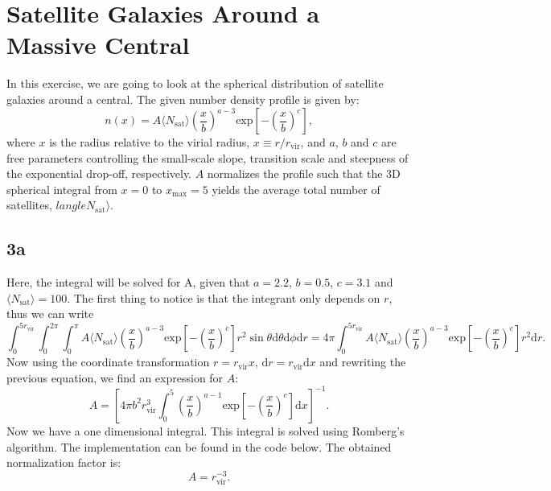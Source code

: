 \section{Satellite Galaxies Around a Massive Central}
In this exercise, we are going to look at the spherical distribution of satellite galaxies around a central. The given number density profile is given by:
\begin{equation}
  n(x) = A \langle N_\mathrm{sat}\rangle \left( \frac{x}{b} \right) ^{a-3} \mathrm{exp} \left[ - \left( \frac{x}{b} \right)^{c} \right],
\end{equation}
where $x$ is the radius relative to the virial radius, $x\equiv r/r_\mathrm{vir}$, and $a$, $b$ and $c$ are free parameters controlling the small-scale slope, transition scale and steepness of the exponential drop-off, respectively. $A$ normalizes the profile such that the 3D spherical integral from $x=0$ to $x_\mathrm{max}=5$ yields the average total number of satellites, $langle N_\mathrm{sat}\rangle$.

\subsection*{3a}
Here, the integral will be solved for A, given that $a = 2.2$, $b = 0.5$, $c = 3.1$ and $\langle N_\mathrm{sat}\rangle = 100$. The first thing to notice is that the integrant only depends on $r$, thus we can write
\begin{equation}
  \int_0^{5r_{\mathrm{vir}}} \int_0^{2\pi} \int_0^{\pi} A \langle N_\mathrm{sat}\rangle \left( \frac{x}{b} \right) ^{a-3} \mathrm{exp} \left[ - \left( \frac{x}{b} \right)^{c} \right] r^2 \sin\theta \mathrm{d}\theta \mathrm{d}\phi \mathrm{d}r = 4\pi \int_0^{5r_{\mathrm{vir}}} A \langle N_\mathrm{sat}\rangle \left( \frac{x}{b} \right) ^{a-3} \mathrm{exp} \left[ - \left( \frac{x}{b} \right)^{c} \right] r^2 \mathrm{d}r.
\end{equation}
Now using the coordinate transformation $r = r_{\mathrm{vir}}x$,  $\mathrm{d}r = r_{\mathrm{vir}}\mathrm{d}x$ and rewriting the previous equation, we find an expression for $A$:
\begin{equation}
  A = \left[ 4\pi b^2 r_{\mathrm{vir}}^3 \int_0^5 \left( \frac{x}{b} \right)^{a-1} \mathrm{exp} \left[ - \left( \frac{x}{b} \right)^{c} \right] \mathrm{d}x   \right]^{-1}.
\end{equation}
Now we have a one dimensional integral. This integral is solved using Romberg's algorithm. The implementation can be found in the code below. The obtained normalization factor is: $$A = r_\mathrm{vir}^{-3}.$$

